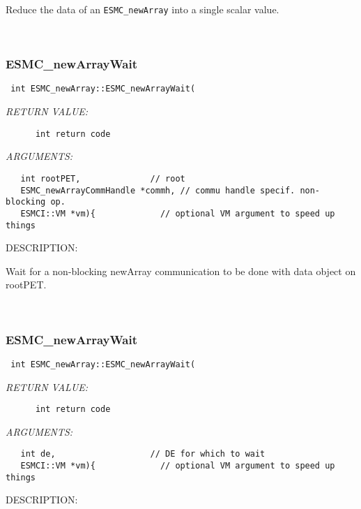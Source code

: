       Reduce the data of an {\tt ESMC\_newArray} into a single scalar value.
   
 
\mbox{}\hrulefill\
 
\subsubsection [ESMC\_newArrayWait] {ESMC\_newArrayWait}


  
\begin{verbatim} int ESMC_newArray::ESMC_newArrayWait(\end{verbatim}{\em RETURN VALUE:}
\begin{verbatim}      int return code\end{verbatim}{\em ARGUMENTS:}
\begin{verbatim}   int rootPET,              // root
   ESMC_newArrayCommHandle *commh, // commu handle specif. non-blocking op.
   ESMCI::VM *vm){             // optional VM argument to speed up things\end{verbatim}
{\sf DESCRIPTION:\\ }


      Wait for a non-blocking newArray communication to be done with data
      object on rootPET.
   
 
\mbox{}\hrulefill\
 
\subsubsection [ESMC\_newArrayWait] {ESMC\_newArrayWait}


  
\begin{verbatim} int ESMC_newArray::ESMC_newArrayWait(\end{verbatim}{\em RETURN VALUE:}
\begin{verbatim}      int return code\end{verbatim}{\em ARGUMENTS:}
\begin{verbatim}   int de,                   // DE for which to wait
   ESMCI::VM *vm){             // optional VM argument to speed up things\end{verbatim}
{\sf DESCRIPTION:\\ }



